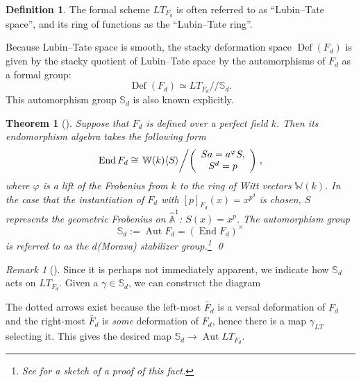 \documentclass{amsart}
\renewcommand{\S}{\mathbb S}
\newcommand{\A}{\widehat{\mathbb{A}}}
\newcommand{\W}{\mathbb W}
\newcommand{\<}{\langle}
\renewcommand{\>}{\rangle}
\renewcommand{\phi}{\varphi}
\newcommand{\mmod}{/\!\!/}
\DeclareMathOperator{\Spec}{Spec}
\DeclareMathOperator{\Aut}{Aut}
\DeclareMathOperator{\Def}{Def}
\theoremstyle{plain}
\newtheorem*{theorem}{Theorem}
\theoremstyle{definition}
\newtheorem*{definition}{Definition}
\theoremstyle{remark}
\newtheorem*{remark}{Remark}
\begin{document}
\begin{definition}
The formal scheme $LT_{F_d}$ is often referred to as ``Lubin--Tate space'', and its ring of functions as the ``Lubin--Tate ring''.
\end{definition}

Because Lubin--Tate space is smooth, the stacky deformation space $\Def(F_d)$ is given by the stacky quotient of Lubin--Tate space by the automorphisms of $F_d$ as a formal group: \[\Def(F_d) \simeq LT_{F_d} \mmod \S_d.\]  This automorphism group $\S_d$ is also known explicitly.

\begin{theorem}[{\cite{Dieudonne,Lubin}}]\label{DefnStabilizerAlgebra}
Suppose that $F_d$ is defined over a perfect field $k$.  Then its endomorphism algebra takes the following form \[\operatorname{End} F_d \cong \left.\W(k)\<S\> \middle/\left( \begin{array}{c} Sa = a^\phi S, \\ S^d = p \end{array}\right) \right.,\] where $\phi$ is a lift of the Frobenius from $k$ to the ring of Witt vectors $\W(k)$.  In the case that the instantiation of $F_d$ with $[p]_{F_d}(x) = x^{p^d}$ is chosen, $S$ represents the geometric Frobenius on $\A^1$: $S(x) = x^p$.  The automorphism group \[\S_d := \Aut F_d = (\operatorname{End} F_d)^\times\] is referred to as the $d$\th (Morava) stabilizer group.\footnote{See  for a sketch of a proof of this fact.} \qed
\end{theorem}

\begin{remark}[{\cite[Section 24]{StricklandFPFP}}]
Since it is perhaps not immediately apparent, we indicate how $\S_d$ acts on $LT_{F_d}$.  Given a $\gamma \in \S_d$, we can construct the diagram
\begin{center}
\end{center}
The dotted arrows exist because the left-most $\widetilde{F_d}$ is a versal deformation of $F_d$ and the right-most $\widetilde{F_d}$ is \emph{some} deformation of $F_d$, hence there is a map $\gamma_{LT}$ selecting it.  This gives the desired map $\S_d \to \Aut LT_{F_d}$.
\end{remark}
\end{document}
